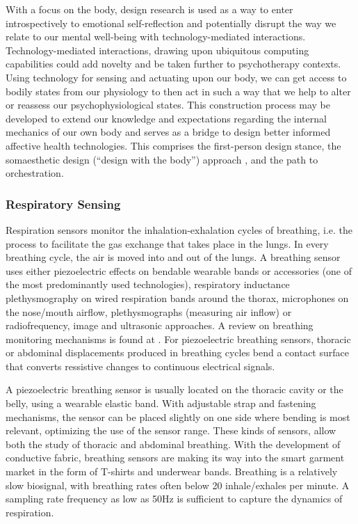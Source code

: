 With a focus on the body, design research is used as a way to enter introspectively to emotional self-reflection and potentially disrupt the way we relate to our mental well-being with technology-mediated interactions. Technology-mediated interactions, drawing upon ubiquitous computing capabilities could add novelty and be taken further to psychotherapy contexts. Using technology for sensing and actuating upon our body, we can get access to bodily states from our physiology to then act in such a way that we help to alter or reassess our psychophysiological states. This construction process may be developed to extend our knowledge and expectations regarding the internal mechanics of our own body and serves as a bridge to design better informed affective health technologies. This comprises the first-person design stance, the somaesthetic design (“design with the body”) approach \cite{hook_designing_2018}, and the path to orchestration.

\subsubsection{Respiratory Sensing}

Respiration sensors monitor the inhalation-exhalation cycles of breathing, i.e. the process to facilitate the gas exchange that takes place in the lungs. In every breathing cycle, the air is moved into and out of the lungs. A breathing sensor uses either piezoelectric effects on bendable wearable bands or accessories (one of the most predominantly used technologies), respiratory inductance plethysmography on wired respiration bands around the thorax, microphones on the nose/mouth airflow, plethysmographs (measuring air inflow) or radiofrequency, image and ultrasonic approaches. A review on breathing monitoring mechanisms is found at \cite{massaroni_contact-based_2019}. For piezoelectric breathing sensors, thoracic or abdominal displacements produced in breathing cycles bend a contact surface that converts ressistive changes to continuous electrical signals.

A piezoelectric breathing sensor is usually located on the thoracic cavity or the belly, using a wearable elastic band. With adjustable strap and fastening mechanisms, the sensor can be placed slightly on one side where bending is most relevant, optimizing the use of the sensor range. These kinds of sensors, allow both the study of thoracic and abdominal breathing. With the development of conductive fabric, breathing sensors are making its way into the smart garment market in the form of T-shirts and underwear bands. Breathing is a relatively slow biosignal, with breathing rates often below 20 inhale/exhales per minute. A sampling rate frequency as low as 50Hz is sufficient to capture the dynamics of respiration.

